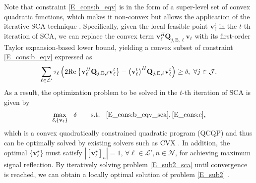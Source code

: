 \documentclass[12pt,draftclsnofoot, onecolumn]{IEEEtran}
\theoremstyle{plain}
\begin{document}
\begin{sloppypar}
Note that constraint \eqref{E_cons:b_eqv} is in the form of a super-level set of convex quadratic functions, which makes it non-convex but allows the application of the iterative SCA technique \cite{2010_Dinh_SCA_converge}. Specifically, given the local feasible point $\mathbf v_{\ell}^t$ in the $t$-th iteration of SCA, we can replace the convex term $\mathbf v_{\ell}^H\mathbf Q_{j,\mathrm E, \ell}\mathbf v_{\ell}$ with its first-order Taylor expansion-based lower bound, yielding a convex subset of constraint \eqref{E_cons:b_eqv} expressed as %
{\setlength\abovedisplayskip{5pt}
\setlength\belowdisplayskip{5pt}
\begin{align}\label{E_cons:b_eqv_sca}
\sum_{\ell\in\mathcal L'}\tau_\ell\left( 2{\rm Re}\left\lbrace\mathbf v_\ell^H\mathbf Q_{j,\mathrm E,\ell}\mathbf v_\ell^t\right\rbrace - \big(\mathbf v_\ell^t\big)^H\mathbf Q_{j,\mathrm E,\ell}\mathbf v_\ell^t\right) \geq \delta, \ \forall j\in\mathcal J. 
\end{align}}%
As a result, the optimization problem to be solved in the $t$-th iteration of SCA is given by
{\setlength\abovedisplayskip{5pt}
\setlength\belowdisplayskip{5pt} 
\begin{align}\label{E_sub2_sca}
\underset{\delta,\{\mathbf v_\ell\}}{\max} \hspace{3mm} \delta \hspace{7mm}
\text{s.t.} \hspace{3mm}\eqref{E_cons:b_eqv_sca}, \eqref{E_cons:e},
\end{align}}%
which is a convex quadratically constrained quadratic program (QCQP) and thus can be optimally solved by existing solvers such as CVX \cite{2004_S.Boyd_cvx}. In addition, the optimal $\{\mathbf v_\ell^\star\}$ must satisfy $\left| \left[\mathbf v_\ell^\star\right]_n\right| = 1$, $\forall \ell\in\mathcal L', n\in\mathcal N$, for achieving maximum signal reflection. By iteratively solving problem \eqref{E_sub2_sca} until convergence is reached, we can obtain a locally optimal solution of problem \eqref{E_sub2} \cite{2010_Dinh_SCA_converge}. 


\end{sloppypar}
\end{document}
